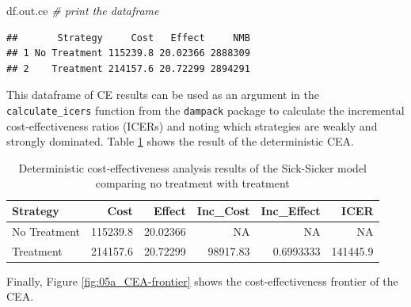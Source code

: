 \documentclass[]{article}
\newenvironment{Shaded}{\begin{snugshade}}{\end{snugshade}}
\newcommand{\KeywordTok}[1]{\textcolor[rgb]{0.13,0.29,0.53}{\textbf{#1}}}
\newcommand{\DataTypeTok}[1]{\textcolor[rgb]{0.13,0.29,0.53}{#1}}
\newcommand{\StringTok}[1]{\textcolor[rgb]{0.31,0.60,0.02}{#1}}
\newcommand{\CommentTok}[1]{\textcolor[rgb]{0.56,0.35,0.01}{\textit{#1}}}
\newcommand{\OperatorTok}[1]{\textcolor[rgb]{0.81,0.36,0.00}{\textbf{#1}}}
\newcommand{\NormalTok}[1]{#1}
\begin{document}
\begin{Shaded}
\begin{Highlighting}[]
\NormalTok{df.out.ce }\CommentTok{# print the dataframe }
\end{Highlighting}
\end{Shaded}

\begin{verbatim}
##       Strategy     Cost   Effect     NMB
## 1 No Treatment 115239.8 20.02366 2888309
## 2    Treatment 214157.6 20.72299 2894291
\end{verbatim}

This dataframe of CE results can be used as an argument in the
\texttt{calculate\_icers} function from the \texttt{dampack} package to
calculate the incremental cost-effectiveness ratios (ICERs) and noting
which strategies are weakly and strongly dominated. Table
\ref{tab:df.cea.det} shows the result of the deterministic CEA.

\begin{Shaded}
\end{Shaded}

\begin{table}[t]

\caption{\label{tab:unnamed-chunk-18}Deterministic cost-effectiveness analysis results of the Sick-Sicker model comparing no treatment with treatment \label{tab:df.cea.det}}
\centering
\begin{tabular}{l|r|r|r|r|r}
\hline
Strategy & Cost & Effect & Inc\_Cost & Inc\_Effect & ICER\\
\hline
No Treatment & 115239.8 & 20.02366 & NA & NA & NA\\
\hline
Treatment & 214157.6 & 20.72299 & 98917.83 & 0.6993333 & 141445.9\\
\hline
\end{tabular}
\end{table}

Finally, Figure \ref{fig:05a_CEA-frontier} shows the cost-effectiveness
frontier of the CEA.
\end{document}
